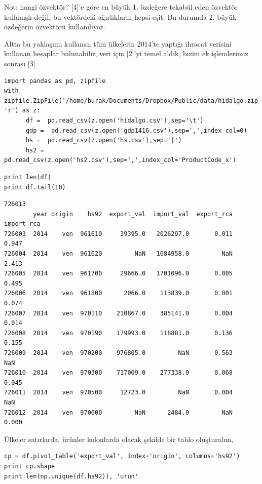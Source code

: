 \documentclass[12pt,fleqn]{article}\usepackage{../../common}
\begin{document}
Not: hangi özvektör? [4]'e göre en büyük 1. özdeğere tekabül eden özvektör
kullanışlı değil, bu vektördeki ağırlıkların hepsi eşit. Bu durumda
2. büyük özdeğerin özvektörü kullanılıyor. 

Altta bu yaklaşımı kullanan tüm ülkelerin 2014'te yaptığı ihracat verisini
kullanan hesaplar bulunabilir, veri için [2]'yi temel aldık, bizim
ek işlemlerimiz sonrası [3].

\begin{verbatim}
import pandas as pd, zipfile
with zipfile.ZipFile('/home/burak/Documents/Dropbox/Public/data/hidalgo.zip', 'r') as z:
      df =  pd.read_csv(z.open('hidalgo.csv'),sep='\t')
      gdp =  pd.read_csv(z.open('gdp1416.csv'),sep=',',index_col=0)
      hs =  pd.read_csv(z.open('hs.csv'),sep='|')
      hs2 =  pd.read_csv(z.open('hs2.csv'),sep=',',index_col='ProductCode_x')
\end{verbatim}

\begin{verbatim}
print len(df)
print df.tail(10)
\end{verbatim}

\begin{verbatim}
726013
        year origin    hs92  export_val  import_val  export_rca  import_rca
726003  2014    ven  961610     39395.0   2026297.0       0.011       0.947
726004  2014    ven  961620         NaN   1084958.0         NaN       2.413
726005  2014    ven  961700     29666.0   1701096.0       0.005       0.495
726006  2014    ven  961800      2066.0    113839.0       0.001       0.074
726007  2014    ven  970110    210867.0    385141.0       0.004       0.014
726008  2014    ven  970190    179993.0    118881.0       0.136       0.155
726009  2014    ven  970200    976805.0         NaN       0.563         NaN
726010  2014    ven  970300    717009.0    277338.0       0.068       0.045
726011  2014    ven  970500     12723.0         NaN       0.004         NaN
726012  2014    ven  970600         NaN      2484.0         NaN       0.000
\end{verbatim}

Ülkeler satırlarda, ürünler kolonlarda olacak şekilde bir tablo oluşturalım,

\begin{verbatim}
cp = df.pivot_table('export_val', index='origin', columns='hs92')
print cp.shape
print len(np.unique(df.hs92)), 'urun'
\end{verbatim}
\end{document}
